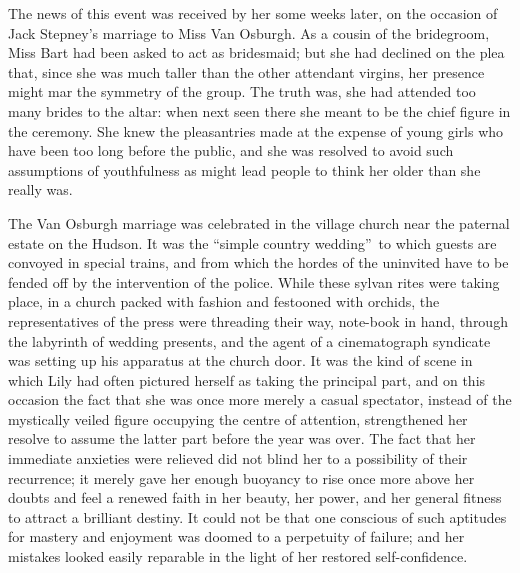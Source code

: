 \documentclass[12pt,a4paper]{book}
\begin{document}
The news of this event was received by her some weeks later, on
the occasion of Jack Stepney's marriage to Miss Van Osburgh. As a
cousin of the bridegroom, Miss Bart had been asked to act as
bridesmaid; but she had declined on the plea that, since she was
much taller than the other attendant virgins, her presence might
mar the symmetry of the group. The truth was, she had attended
too many brides to the altar: when next seen there she meant to
be the chief figure in the ceremony. She knew the pleasantries
made at the expense of young girls who have been too long before
the public, and she was resolved to avoid such assumptions of
youthfulness as might lead people to think her older than she
really was.





The Van Osburgh marriage was celebrated in the village church
near the paternal estate on the Hudson. It was the ``simple
country wedding''\ to which guests are convoyed in special trains,
and from which the hordes of the uninvited have to be fended off
by the intervention of the police. While these sylvan rites were
taking place, in a church packed with fashion and festooned with
orchids, the representatives of the press were threading their
way, note-book in hand, through the labyrinth of wedding
presents, and the agent of a cinematograph syndicate was setting
up his apparatus at the church door. It was the kind of scene in
which Lily had often pictured herself as taking the principal
part, and on this occasion the fact that she was once more merely
a casual spectator, instead of the mystically veiled figure
occupying the centre of attention, strengthened her resolve to
assume the latter part before the year was over. The fact that
her immediate anxieties were relieved did not blind her to a
possibility of their recurrence; it merely gave her enough
buoyancy to rise once more above her doubts and feel a renewed
faith in her beauty, her power, and her general fitness to
attract a brilliant destiny. It could not be that one
conscious of such aptitudes for mastery and enjoyment was doomed
to a perpetuity of failure; and her mistakes looked easily
reparable in the light of her restored self-confidence.
\end{document}
